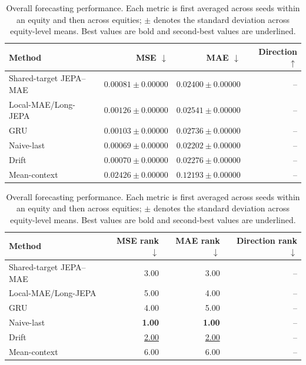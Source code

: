 \begin{table}[t]
\centering
\small
\caption{Overall forecasting performance. Each metric is first averaged across seeds within an equity and then across equities; $\pm$ denotes the standard deviation across equity-level means. Best values are bold and second-best values are underlined.}
\label{tab:main_metrics}
\begin{tabular}{lrrr}
\toprule
Method & MSE $\downarrow$ & MAE $\downarrow$ & Direction $\uparrow$ \\
\midrule
Shared-target JEPA--MAE & $0.00081 \pm 0.00000$ & $0.02400 \pm 0.00000$ & -- \\
Local-MAE/Long-JEPA & $0.00126 \pm 0.00000$ & $0.02541 \pm 0.00000$ & -- \\
GRU & $0.00103 \pm 0.00000$ & $0.02736 \pm 0.00000$ & -- \\
Naive-last & \textbf{$0.00069 \pm 0.00000$} & \textbf{$0.02202 \pm 0.00000$} & -- \\
Drift & \underline{$0.00070 \pm 0.00000$} & \underline{$0.02276 \pm 0.00000$} & -- \\
Mean-context & $0.02426 \pm 0.00000$ & $0.12193 \pm 0.00000$ & -- \\
\bottomrule
\end{tabular}
\par\medskip
\begin{tabular}{lrrr}
\toprule
Method & MSE rank $\downarrow$ & MAE rank $\downarrow$ & Direction rank $\downarrow$ \\
\midrule
Shared-target JEPA--MAE & 3.00 & 3.00 & -- \\
Local-MAE/Long-JEPA & 5.00 & 4.00 & -- \\
GRU & 4.00 & 5.00 & -- \\
Naive-last & \textbf{1.00} & \textbf{1.00} & -- \\
Drift & \underline{2.00} & \underline{2.00} & -- \\
Mean-context & 6.00 & 6.00 & -- \\
\bottomrule
\end{tabular}
\end{table}

